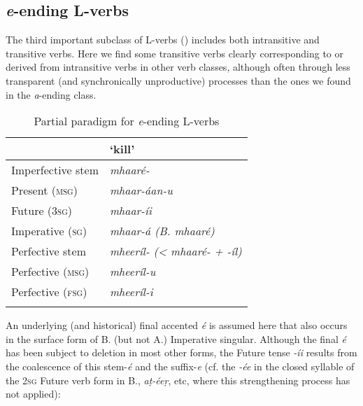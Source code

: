 \subsection{\textit{e}-ending L-verbs}
\label{subsec:8-3-3}


The third important subclass of L-verbs () includes both intransitive and transitive verbs. Here we find some transitive verbs clearly corresponding to or derived from intransitive verbs in other verb classes, although often through less transparent (and synchronically unproductive) processes than the ones we found in the \textit{a}-ending class.


\begin{table}[ht]
\caption{Partial paradigm for \textit{e}-ending L-verbs}
\begin{tabularx}{.75\textwidth}{ Q Q }
\lsptoprule
&
`kill'\\\hline
Imperfective stem &
\textit{mhaaré-}\\
Present (\textsc{msg}) &
\textit{mhaar-áan-u} \\
Future (\textsc{3sg}) &
\textit{mhaar-íi} \\
Imperative (\textsc{sg}) &
\textit{mhaar-á (B. mhaaré)}\\
Perfective stem &
\textit{mheeríl- ({\textless} mhaaré- + -íl)}\\
Perfective (\textsc{msg}) &
\textit{mheeríl-u} \\
Perfective (\textsc{fsg}) &
\textit{mheeríl-i} \\\lspbottomrule
\end{tabularx}
\label{tab:8-6}
\end{table}


An underlying (and historical) final accented \textit{é} is assumed here that also occurs in the surface form of B. (but not A.) Imperative singular. Although the final \textit{é} has been subject to deletion in most other forms, the Future tense \textit{-íi} results from the coalescence of this stem-\textit{é} and the suffix-\textit{e} (cf. the \textit{-ée} in the closed syllable of the \textsc{2sg} Future verb form in B., \textit{aṭ-éeṛ}, etc, where this strengthening process has not applied):


